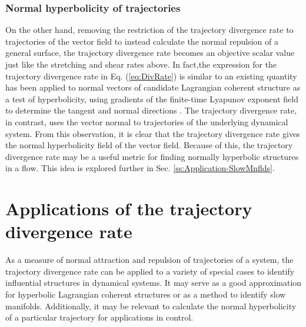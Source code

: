 \documentclass[twocolumn]{svjour3}
\newcommand{\edit}[3]{{\color{red} #2}}
\begin{document}
\edit{}{
	\subsubsection{Normal hyperbolicity of trajectories}
	On the other hand, removing the restriction of the trajectory divergence rate to trajectories of the vector field to instead calculate the normal repulsion of a general surface, the trajectory divergence rate becomes an objective scalar value just like the stretching and shear rates above. In fact,the expression for the trajectory divergence rate in Eq. (\ref{eq:DivRate}) is similar to an existing quantity has been applied to normal vectors of candidate Lagrangian coherent structure as a test of hyperbolicity, using gradients of the finite-time Lyapunov exponent field to determine the tangent and normal directions \cite{green2010using}. The trajectory divergence rate, in contrast, uses the vector normal to trajectories of the underlying dynamical system. From this observation, it is clear that the trajectory divergence rate gives the normal hyperbolicity field of the vector field. Because of this, the trajectory divergence rate may be a useful metric for finding normally hyperbolic structures in a flow. This idea is explored further in Sec. \ref{ss:Application-SlowMnflds}.}{16}

\edit{
From the stretch rate $\dot{p}$ criterion, the authors find that hyperbolic OECSs must contain isolated local minima or maxima of the eigenvalues of $\mathbf{S}$, $s_1$ and $s_2$, respectively.}{}{17}

\section{Applications of the trajectory divergence rate}\label{s:Application}
As a measure of normal attraction and repulsion of trajectories of a system, the trajectory divergence rate can be applied to a variety of special cases to identify influential structures in dynamical systems. It may serve as a good approximation for hyperbolic Lagrangian coherent structures or as a method to identify slow manifolds. Additionally, it may be relevant to calculate the normal hyperbolicity of a particular trajectory for applications in control.
\end{document}
